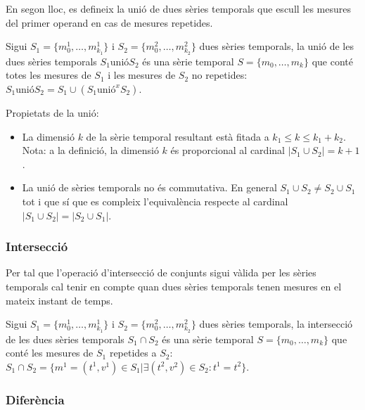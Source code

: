 En segon lloc, es defineix la unió de dues sèries temporals que escull
les mesures del primer operand en cas de mesures repetides.

\begin{definition}[unió]
  Sigui $S_1=\{m_0^1, \dotsc, m_{k_1}^1\}$ i $S_2=\{m_0^2, \dotsc,
  m_{k_2}^2\}$ dues sèries temporals, la unió de les dues sèries
  temporals $S_1 \text{unió} S_2$ és una sèrie temporal $S=\{m_0, \dotsc,
  m_k\}$ que conté totes les mesures de $S_1$ i les mesures de $S_2$
  no repetides: $S_1 \text{unió} S_2 = S_1 \cup (S_1 \text{unió}^x S_2)$. 

\end{definition}

Propietats de la unió:

\begin{itemize}
\item La dimensió $k$ de la sèrie temporal resultant està fitada a
  $k_1 \leq k \leq k_1 + k_2$. Nota: a la definició, la dimensió $k$ és
  proporcional al cardinal $|S_1\cup S_2| = k+1$.
\item La unió de sèries temporals no és commutativa. En general
  $S_1\cup S_2 \neq S_2\cup S_1$ tot i que sí que es compleix
  l'equivalència respecte al cardinal $|S_1\cup S_2| = |S_2\cup S_1|$.
\end{itemize}



\subsubsection{Intersecció}

Per tal que l'operació d'intersecció de conjunts sigui vàlida per les sèries
temporals cal tenir en compte quan dues sèries temporals tenen mesures
en el mateix instant de temps.

\begin{definition}[intersecció]
  Sigui $S_1=\{m_0^1, \dotsc, m_{k_1}^1\}$ i $S_2=\{m_0^2, \dotsc,
  m_{k_2}^2\}$ dues sèries temporals, la intersecció de les dues
  sèries temporals $S_1 \cap S_2$ és una sèrie temporal $S=\{m_0,
  \dotsc, m_k\}$ que conté les mesures de $S_1$ repetides a $S_2$:
  $S_1 \cap S_2 = \{ m^1 = (t^1,v^1) \in S_1 | \exists (t^2,v^2)\in
  S_2 : t^1 = t^2\}$.
\end{definition}


\subsubsection{Diferència}

